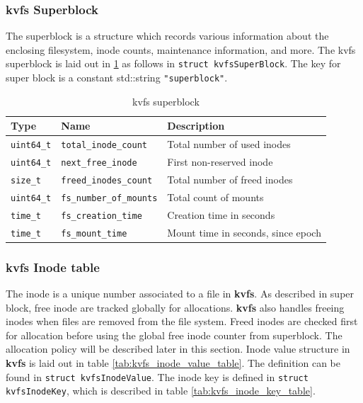 \documentclass[bsc,frontabs,twoside,singlespacing,parskip,deptreport]{infthesis}     %
\begin{document}
{\subsubsection{kvfs Superblock}
The superblock is a structure which records various information about the enclosing filesystem, inode counts, maintenance information, and more. The kvfs superblock is laid out in \ref{tab:kvfs_superblock_table} as follows in {\tt struct kvfsSuperBlock}. The key for super block is a constant std::string {\tt "superblock"}. 
\begin{table}[h]
	\begin{center}
		\caption{kvfs superblock}
		\label{tab:kvfs_superblock_table}
		\begin{tabular}{l|l|l}
		   \hline
			\textbf{Type} & \textbf{Name} & \textbf{Description} \\
			\hline
			{\tt uint64\_t} &  {\tt total\_inode\_count} & {Total number of used inodes} \\
			{\tt uint64\_t} & {\tt next\_free\_inode} & {First non-reserved inode} \\
			{\tt size\_t} & {\tt freed\_inodes\_count} & {Total number of freed inodes } \\
			{\tt uint64\_t} & {\tt fs\_number\_of\_mounts} & {Total count of mounts} \\
			{\tt time\_t} & {\tt fs\_creation\_time} & {Creation time in seconds} \\
			{\tt time\_t} & {\tt fs\_mount\_time} & {Mount time in seconds, since epoch} \\			
			\hline			
			\end{tabular}
	\end{center}
\end{table}

\subsubsection{kvfs Inode table}
The inode is a unique number associated to a file in {\bf kvfs}. As described in super block, free inode are tracked globally for allocations. {\bf kvfs} also handles freeing inodes when files are removed from the file system. Freed inodes are checked first for allocation before using the global free inode counter from superblock. The allocation policy will be described later in this section. Inode value structure in {\bf kvfs} is laid out in table \ref{tab:kvfs_inode_value_table}.  The definition can be found in {\tt struct kvfsInodeValue}. The inode key is defined in {\tt struct kvfsInodeKey}, which is described in table \ref{tab:kvfs_inode_key_table}.

}
\end{document}
